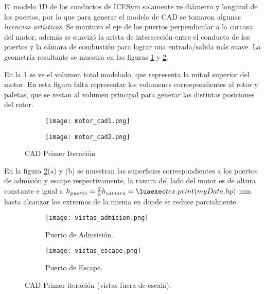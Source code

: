 El modelo 1D de los conductos de ICESym solamente ve diámetro y longitud  de los
puertos, por lo que para generar el modelo de CAD se tomaron algunas
\emph{licencias artísticas}.
%
Se mantuvo el eje de los puertos perpendicular a la carcasa del motor, además se
suavizó la arista de intersección entre el conducto de los puertos y la cámara
de combustión para lograr una entrada/salida más suave.
%
La geometría resultante se muestra en las figuras \ref{fig:motor_cad1} y
\ref{fig:motor_cad2}.

En la \ref{fig:motor_cad1} se ve el volumen total modelado, que representa la
mitad superior del motor.
%
En esta figura falta representar los volumenes correspondientes al rotor y
paletas, que se restan al volumen principal para generar las distintas
posiciones del rotor.


\begin{figure}
  \centering
    \begin{subfigure}{0.4\textwidth}
        \centering
        \texttt{[image: motor\_cad1.png]}
    \end{subfigure}
    \begin{subfigure}{0.4\textwidth}
        \centering
        \texttt{[image: motor\_cad2.png]}
    \end{subfigure}
  \caption{CAD Primer Iteración}
  \label{fig:motor_cad1}
\end{figure}

En la figura \ref{fig:motor_cad2}(a) y (b) se muestran las superficies
correspondientes a los puertos de admisión y escape respectivamente, la ranura
del lado del motor es de altura constante e igual a $h_{puerto} = \frac{2}{3}
h_{camara} = \lua{tex.print(myData.hp)}$ mm hasta alcanzar los extremos de la
misma en donde se reduce parcialmente.

\begin{figure}
  \centering
    \begin{subfigure}{0.8\textwidth}
        \centering
        \texttt{[image: vistas\_admision.png]}
        \caption{Puerto de Admsisión.}
    \end{subfigure}
    \begin{subfigure}{0.8\textwidth}
        \centering
        \texttt{[image: vistas\_escape.png]}
        \caption{Puerto de Escape.}
    \end{subfigure}
  \caption{CAD Primer iteración (vistas fuera de escala).}
  \label{fig:motor_cad2}
\end{figure}
